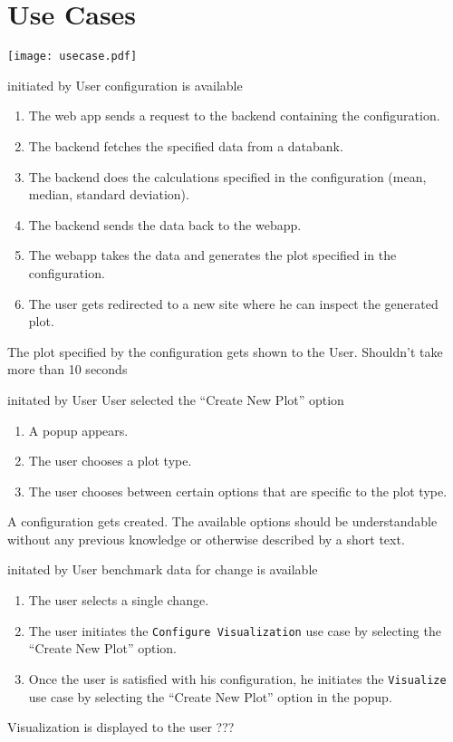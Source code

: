 \section{Use Cases}

\texttt{[image: usecase.pdf]}

{initiated by User}
{\gls{configuration} is available}
{\begin{enumerate}
    \item The web app sends a request to the backend containing the \gls{configuration}.
    \item The backend fetches the specified data from a databank.
    \item The backend does the calculations specified in the \gls{configuration} (mean, median, standard deviation).
    \item The backend sends the data back to the webapp.
    \item The webapp takes the data and generates the plot specified in the \gls{configuration}.
    \item The user gets redirected to a new site where he can inspect the generated plot.
\end{enumerate}}
{The plot specified by the \gls{configuration} gets shown to the User.}
{Shouldn't take more than 10 seconds}

\bigskip

{initated by User}
{User selected the \enquote{Create New Plot} option}
{\begin{enumerate}
    \item A popup appears.
    \item The user chooses a plot type.
    \item The user chooses between certain options that are specific to the plot type.
\end{enumerate}}
{A \gls{configuration} gets created.}
{The available options should be understandable without any previous knowledge or otherwise described by a short text.}

\bigskip

{initated by User}
{benchmark data for change is available}
{\begin{enumerate}
    \item The user selects a single change.
    \item The user initiates the \texttt{Configure Visualization} use case by selecting the \enquote{Create New Plot} option.
    \item Once the user is satisfied with his \gls{configuration}, he initiates the \texttt{Visualize} use case by selecting the \enquote{Create New Plot} option in the popup.
\end{enumerate}}
{Visualization is displayed to the user}
{???}

